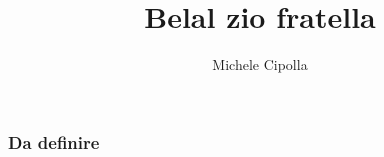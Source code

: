 \documentclass{beamer}
\title[Ancora lontana]{Belal zio fratella}
\author{Michele Cipolla}
\date{}
\begin{document}
\begin{frame}
\titlepage
\end{frame}

\begin{frame}
\frametitle{Da definire}
\tableofcontents
\end{frame}




\end{document}
